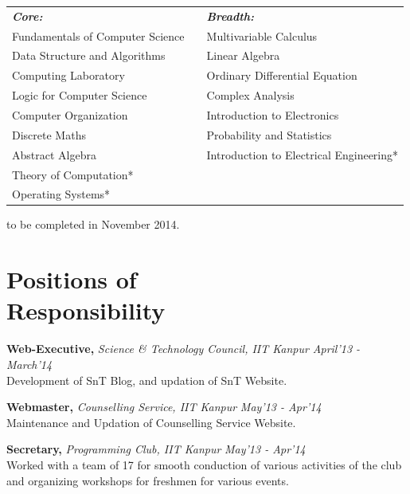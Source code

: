 \documentclass[margin,10pt]{resume}
\begin{document}
\begin{resume}
\begin{table}[h]
\begin{tabular}{lll}
{\emph{\textbf{Core:}}} & & {\emph{\textbf{Breadth:}}} \\

 Fundamentals of Computer Science 	& \hspace{10mm} 	& Multivariable Calculus \\
 Data Structure and Algorithms		& \hspace{10mm} 	& Linear Algebra \\
 Computing Laboratory				& \hspace{10mm} 	& Ordinary Differential Equation \\
 Logic for Computer Science			& \hspace{10mm} 	& Complex Analysis \\
 Computer Organization				& \hspace{10mm} 	& Introduction to Electronics \\
 Discrete Maths						& \hspace{10mm} 	& Probability and Statistics \\
 Abstract Algebra 					& \hspace{10mm} 	& Introduction to Electrical Engineering* \\
 Theory of Computation*\\
 Operating Systems*\\

\end{tabular}

{\vspace{2mm}\small * to be completed in November 2014.}
\end{table}



\section{\mysidestyle Positions of\\Responsibility } 
\vspace{5mm}
\begin{list2}
\item \textbf{Web-Executive,} \emph{Science \& Technology Council, IIT Kanpur} \hfill \emph{April'13 - March'14}\\
Development of SnT Blog, and updation of SnT Website.

\item \textbf{Webmaster,} \emph{Counselling Service, IIT Kanpur} \hfill \emph{May'13 - Apr'14}\\
Maintenance and Updation of Counselling Service Website.

\item \textbf{Secretary,} \emph{Programming Club, IIT Kanpur}  \hfill \emph{May'13 - Apr'14} \\
Worked with a team of 17 for smooth conduction of various activities of the club and organizing workshops for freshmen for various events.

\end{list2}

\end{resume}
\end{document}
